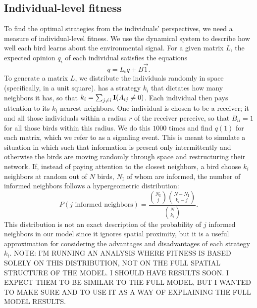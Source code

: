 \documentclass{article}
\begin{document}
\subsection{Individual-level fitness }
To find the optimal strategies from the individuals' perspectives, we need a measure of individual-level fitness. We use the dynamical system to describe how well each bird learns about the environmental signal. For a given matrix $L$, the expected opinion $q_i$ of each individual satisfies the equations
\begin{equation}
\dot{q}=L_\text{s}q+B\vec{1}. \label{expected_opinion}
\end{equation}
To generate a matrix $L$, we distribute the individuals randomly in space (specifically, in a unit square). has a strategy $k_i$ that dictates how many neighbors it has, so that $k_i=\sum_{j\neq i}{\bf I}(A_{ij}\neq 0)$.    Each individual then pays attention to its $k_i$ nearest neighbors.  One individual is chosen to be a receiver; it and all those individuals within a radius $r$ of the receiver perceive, so that $B_{ii}=1$ for all those birds within this radius. We do this $1000$ times and find $q(1)$ for each matrix, which we refer to as a signaling event. This is meant to simulate a situation in which such that information is present only intermittently and otherwise the birds are moving randomly through space and restructuring their network.  If, instead of paying attention to the closest neighbors, a bird choose $k_i$ neighbors at random out of $N$ birds, $N_\text{I}$ of whom are informed, the number of informed neighbors follows a hypergeometric distribution:
\begin{equation}
P(j \text{ informed neighbors} )=\frac{{N_\text{I}\choose j}{N-N_\text{I}\choose k_i-j}  }{{N\choose k_i}}. \label{hypergeom}
\end{equation} 
This distribution is not an exact description of the probability of $j$ informed neighbors in our model  since it ignores spatial proximity, but it is a useful approximation for considering the advantages and disadvantages of each strategy $k_i$. {\red NOTE: I'M RUNNING AN ANALYSIS WHERE FITNESS IS BASED SOLELY ON THIS DISTRIBUTION, NOT ON THE FULL SPATIAL STRUCTURE OF THE MODEL.  I SHOULD HAVE RESULTS SOON. I EXPECT THEM TO BE SIMILAR TO THE FULL MODEL, BUT I WANTED TO MAKE SURE AND TO USE IT AS A WAY OF EXPLAINING THE FULL MODEL RESULTS.}
\end{document}
